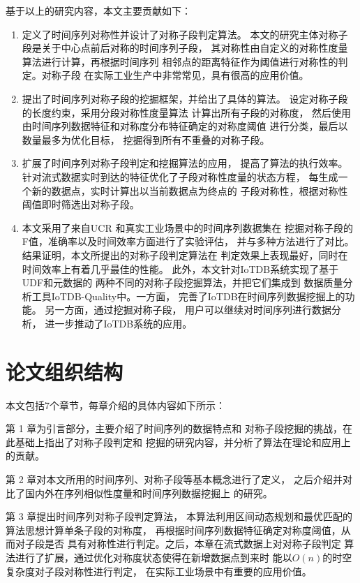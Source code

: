 基于以上的研究内容，本文主要贡献如下：
\begin{enumerate}
\item 定义了时间序列对称性并设计了对称子段判定算法。
本文的研究主体对称子段是关于中心点前后对称的时间序列子段，
其对称性由自定义的对称性度量算法进行计算，再根据时间序列
相邻点的距离特征作为阈值进行对称性的判定。对称子段
在实际工业生产中非常常见，具有很高的应用价值。
\item 提出了时间序列对称子段的挖掘框架，并给出了具体的算法。
设定对称子段的长度约束，采用分段对称性度量算法
计算出所有子段的对称度，
然后使用由时间序列数据特征和对称度分布特征确定的对称度阈值
进行分类，最后以数量最多为优化目标，
挖掘得到所有不重叠的对称子段。
\item 扩展了时间序列对称子段判定和挖掘算法的应用，
提高了算法的执行效率。
针对流式数据实时到达的特征优化了子段对称性度量的状态方程，
每生成一个新的数据点，实时计算出以当前数据点为终点的
子段对称性，根据对称性阈值即时筛选出对称子段。
\item 本文采用了来自UCR\cite{DBLP:journals/ieeejas/DauBKYZGRK19}
和真实工业场景中的时间序列数据集在
挖掘对称子段的F值，准确率以及时间效率方面进行了实验评估，
并与多种方法进行了对比。
结果证明，本文所提出的对称子段判定算法在
判定效果上表现最好，同时在时间效率上有着几乎最佳的性能。
此外，本文针对IoTDB系统实现了基于UDF和元数据的
两种不同的对称子段挖掘算法，并把它们集成到
数据质量分析工具IoTDB-Quality中。一方面，
完善了IoTDB在时间序列数据挖掘上的功能。
另一方面，通过挖掘对称子段，
用户可以继续对时间序列进行数据分析，
进一步推动了IoTDB系统的应用。
\end{enumerate}

\section{论文组织结构}

本文包括7个章节，每章介绍的具体内容如下所示：

第 1 章为引言部分，主要介绍了时间序列的数据特点和
对称子段挖掘的挑战，在此基础上指出了对称子段判定和
挖掘的研究内容，并分析了算法在理论和应用上的贡献。

第 2 章对本文所用的时间序列、对称子段等基本概念进行了定义，
之后介绍并对比了国内外在序列相似性度量和时间序列数据挖掘上
的研究。

第 3 章提出时间序列对称子段判定算法，
本算法利用区间动态规划和最优匹配的算法思想计算单条子段的对称度，
再根据时间序列数据特征确定对称度阈值，从而对子段是否
具有对称性进行判定。之后，本章在流式数据上对对称子段判定
算法进行了扩展，通过优化对称度状态使得在新增数据点到来时
能以$O(n)$的时空复杂度对子段对称性进行判定，
在实际工业场景中有重要的应用价值。

